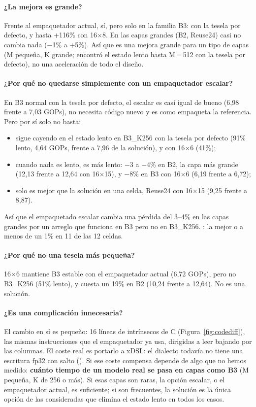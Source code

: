 \paragraph{¿La mejora es grande?} Frente al empaquetador actual, sí, pero solo en la familia B3:  con
la tesela por defecto, y hasta +116\% con 16$\times$8. En las capas grandes (B2, Reuse24) casi no cambia nada ($-$1\% a +5\%). Así
que es una mejora grande para un tipo de capas (M pequeña, K grande;  encontró el estado lento hasta M\,=\,512 con la tesela
por defecto), no una aceleración de todo el diseño.

\paragraph{¿Por qué no quedarse simplemente con un empaquetador escalar?} En B3 normal con la tesela por defecto, el escalar es casi
igual de bueno (6,98 frente a 7,03 GOPs), no necesita código nuevo y es como empaqueta la referencia. Pero por sí solo no basta:
\begin{itemize}
  \item sigue cayendo en el estado lento en B3\_K256 con la tesela por defecto (91\% lento, 4,64 GOPs, frente a 7,96 de la solución), y
  con 16$\times$6 (41\%);
  \item cuando nada es lento, es más lento: $-$3 a $-$4\% en B2, la capa más grande (12,13 frente a 12,64 con 16$\times$15), y $-$8\%
  en B3 con 16$\times$6 (6,19 frente a 6,72);
  \item solo es mejor que la solución en una celda, Reuse24 con 16$\times$15 (9,25 frente a 8,87).
\end{itemize}
Así que el empaquetado escalar cambia una pérdida del 3--4\% en las capas grandes por un arreglo que funciona en B3 pero no en
B3\_K256. : la mejor o a menos de un 1\% en 11
de las 12 celdas.

\paragraph{¿Por qué no una tesela más pequeña?} 16$\times$6 mantiene B3 estable con el empaquetador actual (6,72 GOPs), pero no
B3\_K256 (51\% lento), y cuesta un 19\% en B2 (10,24 frente a 12,64). No es una solución.

\paragraph{¿Es una complicación innecesaria?} El cambio en sí es pequeño: 16 líneas de intrínsecos de C
(Figura~\ref{fig:codediff}), las mismas instrucciones que el empaquetador ya usa, dirigidas a leer bajando por las columnas. El coste
real es portarlo a xDSL: el dialecto todavía no tiene una escritura fp32 con salto (). Si ese coste compensa depende de algo
que no hemos medido: \textbf{cuánto tiempo de un modelo real se pasa en capas como B3} (M pequeña, K de 256 o más). Si esas capas son
raras, la opción escalar, o el empaquetador actual, es suficiente; si son frecuentes, la solución es la única opción de las
consideradas que elimina el estado lento en todos los casos.

